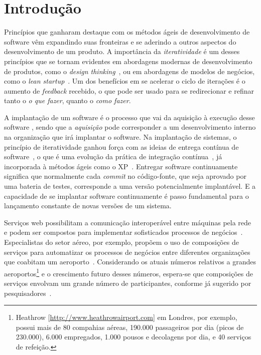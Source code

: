\chapter{Introdução}
\label{cap:introducao}

Princípios que ganharam destaque com os métodos ágeis de desenvolvimento
de software vêm expandindo suas fronteiras e se aderindo a outros aspectos
do desenvolvimento de um produto. A importância da \emph{iteratividade}
é um desses princípios que se tornam evidentes em abordagens modernas de
desenvolvimento de produtos, como o \emph{design thinking}~\cite{Brown2009DesignThinking},
ou em abordagens de modelos de negócios, como o \emph{lean startup}~\cite{Ries2011Lean}.
Um dos benefícios em se acelerar o ciclo de iterações é o aumento
de \emph{feedback} recebido, o que pode ser usado
para se redirecionar e refinar tanto o \emph{o que fazer}, 
quanto o \emph{como fazer}.

A implantação de um software é o
processo que vai da aquisição à
execução desse software \cite{DEPL2006},
sendo que a \emph{aquisição} pode corresponder 
a um desenvolvimento interno na organização que irá implantar o software.
Na implantação de sistemas, 
o princípio de iteratividade
ganhou força com as ideias de entrega contínua de software~\cite{Humble2011Continuous},
o que é uma evolução da prática de integração contínua~\cite{Duvall2007Integration}, 
já incorporada à métodos ágeis como o XP~\cite{Beck1999XP}.
Entregar software continuamente significa que normalmente cada \emph{commit}
no código-fonte, que seja aprovado por uma bateria de testes,
corresponde a uma versão potencialmente implantável.
E a capacidade de se implantar software continuamente é passo fundamental
para o lançamento constante de novas versões de um sistema.

Serviços web possibilitam a comunicação interoperável entre máquinas pela rede~\cite{W3C2004WS}
e podem ser compostos para implementar sofisticados processos de negócios~\cite{Papazoglou2007State}.
Especialistas do setor aéreo, por exemplo, propõem o uso de composições de serviços
para automatizar os processos de negócios entre diferentes organizações
que coabitam um aeroporto~\cite{Choreos2012D6.2}.
Considerando os atuais números relativos a grandes
aeroportos\footnote{Heathrow [\url{http://www.heathrowairport.com}] em Londres, por exemplo, 
possui mais de 80 compahias aéreas, 190.000 passageiros por dia (picos de 230.000),
6.000 empregados, 1.000 pousos e decolagens por dia, e 40 serviços de refeição.}
e o crescimento futuro desses números, espera-se que
composições de serviços envolvam um grande número de participantes,
conforme já sugerido por 
pesquisadores~\cite{Valerie2011FutureInternet,Papadimitriou2009FutureInternet}.

